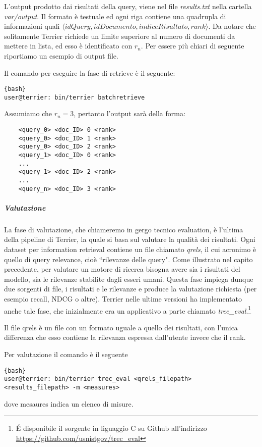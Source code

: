 L'output prodotto dai risultati della query, viene
nel file \textit{results.txt} nella cartella \textit{var/output}. Il formato è testuale
ed ogni riga contiene una quadrupla di informazioni quali
$\langle idQuery, idDocumento, indiceRisultato, rank \rangle$.
Da notare che solitamente Terrier richiede un limite superiore
al numero di documenti da mettere in lista, ed esso è identificato
con $r_n$. Per essere più chiari di seguente riportiamo un esempio
di output file.

Il comando per eseguire la fase di retrieve è il seguente:
\begin{lstlisting}{bash}
user@terrier: bin/terrier batchretrieve
\end{lstlisting}

\begin{esempio}
	Assumiamo che $r_n=3$, pertanto l'output sarà della forma:
	
	\begin{lstlisting}
	<query_0> <doc_ID> 0 <rank>
	<query_0> <doc_ID> 1 <rank>
	<query_0> <doc_ID> 2 <rank>
	<query_1> <doc_ID> 0 <rank>
	...
	<query_1> <doc_ID> 2 <rank>
	...
	<query_n> <doc_ID> 3 <rank>
	\end{lstlisting}
\end{esempio}

\subparagraph{Valutazione} La fase di valutazione, che chiameremo in gergo tecnico evaluation,
è l'ultima della pipeline di Terrier, la quale si basa sul valutare la qualità dei risultati.
Ogni dataset per information retrieval contiene un file chiamato \textit{qrels}, il cui
acronimo è quello di query relevance, cioè ``rilevanze delle query".
Come illustrato nel capito precedente, per valutare un motore di ricerca bisogna
avere sia i risultati del modello, sia le rilevanze stabilite dagli esseri umani.
Questa fase impiega dunque due sorgenti di file, i risultati e le rilevanze e produce
la valutazione richiesta (per esempio recall, NDCG o altre).
Terrier nelle ultime versioni ha implementato anche tale fase,
che inizialmente era un applicativo a parte chiamato \textit{trec\_eval}.\footnote{\'E disponibile il sorgente in liguaggio C su Github all'indirizzo \href{https://github.com/usnistgov/trec_eval}{https://github.com/usnistgov/trec\_eval}}

Il file qrels è un file con un formato uguale a quello dei risultati,
con l'unica differenza che esso contiene la rilevanza espressa dall'utente invece che il rank.

Per valutazione il comando è il seguente
\begin{lstlisting}{bash}
user@terrier: bin/terrier trec_eval <qrels_filepath> <results_filepath> -m <measures>
\end{lstlisting}

dove mesaures indica un elenco di misure.

